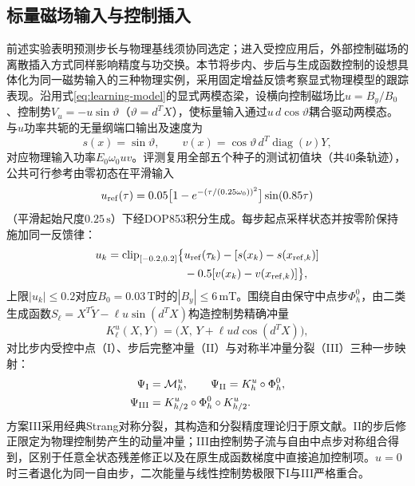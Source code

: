 \subsection{标量磁场输入与控制插入}

前述实验表明预测步长与物理基线须协同选定；进入受控应用后，外部控制磁场的离散插入方式同样影响精度与功交换。本节将步内、步后与生成函数控制的设想具体化为同一磁势输入的三种物理实例，采用固定增益反馈考察显式物理模型的跟踪表现。沿用式\eqref{eq:learning-model}的显式两模态梁，设横向控制磁场比$u=B_y/B_0$、控制势$V_u=-u\sin\vartheta$（$\vartheta=d^TX$），使标量输入通过$u\,d\cos\vartheta$耦合驱动两模态。与$u$功率共轭的无量纲端口输出及速度为
\begin{equation}
 s(x)=\sin\vartheta,\qquad
 v(x)=\cos\vartheta\,d^T\operatorname{diag}(\nu)Y,
 \label{eq:control-port}
\end{equation}
对应物理输入功率$E_0\omega_0uv$。评测复用全部五个种子的测试初值块（共40条轨迹），公共可行参考由零初态在平滑输入
\[
 u_{\rm ref}(\tau)=0.05\bigl[1-e^{-(\tau/(0.25\omega_0))^2}\bigr]
                    \sin(0.85\tau)
\]
（平滑起始尺度$0.25\,\mathrm s$）下经DOP853积分生成。每步起点采样状态并按零阶保持施加同一反馈律：
\begin{equation}
\begin{aligned}
 u_k=\operatorname{clip}_{[-0.2,0.2]}\bigl\{
 &u_{\rm ref}(\tau_k)-[s(x_k)-s(x_{{\rm ref},k})]\\
 &-0.5[v(x_k)-v(x_{{\rm ref},k})]\bigr\},
\end{aligned}
\label{eq:control-law}
\end{equation}
上限$|u_k|\leq0.2$对应$B_0=0.03\,\mathrm T$时的$|B_y|\leq6\,\mathrm{mT}$。围绕自由保守中点步$\Phi_h^0$，由二类生成函数$S_\ell=X^T\widetilde Y-\ell u\sin(d^TX)$构造控制势精确冲量
\[
 K_\ell^u(X,Y)=\bigl(X,\,Y+\ell u d\cos(d^TX)\bigr),
\]
对比步内受控中点（I）、步后完整冲量（II）与对称半冲量分裂（III）三种一步映射：
\begin{equation}
 \begin{aligned}
 \Psi_{\rm I}&=\mathcal M_h^u,\qquad
 \Psi_{\rm II}=K_h^u\circ\Phi_h^0,\\
 \Psi_{\rm III}&=K_{h/2}^u\circ\Phi_h^0\circ K_{h/2}^u.
 \end{aligned}
 \label{eq:control-maps}
\end{equation}
方案III采用经典Strang对称分裂\citep{Strang1968}，其构造和分裂精度理论归于原文献。II的步后修正限定为物理控制势产生的动量冲量；III由控制势子流与自由中点步对称组合得到，区别于任意全状态残差修正以及在原生成函数梯度中直接追加控制项。$u=0$时三者退化为同一自由步，二次能量与线性控制势极限下I与III严格重合。

